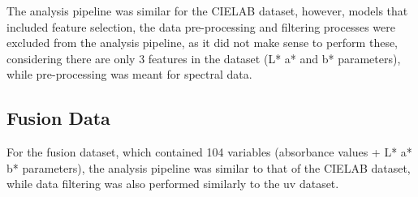 The analysis pipeline was similar for the CIELAB dataset, however, models that included feature selection, the data pre-processing and filtering processes were excluded from the analysis pipeline, as it did not make sense to perform these, considering there are only 3 features in the dataset (L* a* and b* parameters), while pre-processing was meant for spectral data.

\subsection{Fusion Data}

For the fusion dataset, which contained 104 variables (absorbance values + L* a* b* parameters), the analysis pipeline was similar to that of the CIELAB dataset, while data filtering was also performed similarly to the \gls{uv} dataset.







